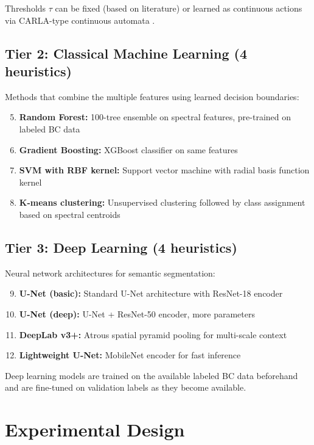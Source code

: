 \documentclass[12pt,oneside]{book}
\begin{document}
Thresholds $\tau$ can be fixed (based on literature) or learned as continuous actions via CARLA-type continuous automata \citep{Cuevas2011}.

\subsection{Tier 2: Classical Machine Learning (4 heuristics)}

Methods that combine the multiple features using learned decision boundaries:
\begin{enumerate}
    \setcounter{enumi}{4}
    \item \textbf{Random Forest:} 100-tree ensemble on spectral features, pre-trained on labeled BC data
    \item \textbf{Gradient Boosting:} XGBoost classifier on same features
    \item \textbf{SVM with RBF kernel:} Support vector machine with radial basis function kernel
    \item \textbf{K-means clustering:} Unsupervised clustering followed by class assignment based on spectral centroids
\end{enumerate}

\subsection{Tier 3: Deep Learning (4 heuristics)}

Neural network architectures for semantic segmentation:
\begin{enumerate}
    \setcounter{enumi}{8}
    \item \textbf{U-Net (basic):} Standard U-Net architecture with ResNet-18 encoder
    \item \textbf{U-Net (deep):} U-Net + ResNet-50 encoder, more parameters
    \item \textbf{DeepLab v3+:} Atrous spatial pyramid pooling for multi-scale context
    \item \textbf{Lightweight U-Net:} MobileNet encoder for fast inference
\end{enumerate}

Deep learning models are trained on the available labeled BC data beforehand and are fine-tuned on validation labels as they become available.

\section{Experimental Design}
\label{sec:experimental-design}
\end{document}
